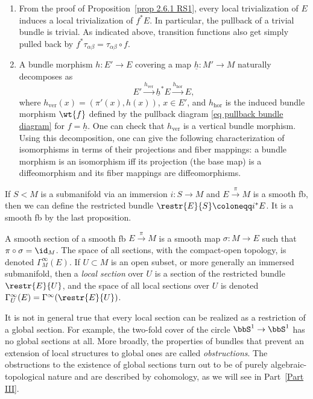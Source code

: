 \begin{rem}
\begin{enumerate}
    \item From the proof of Proposition~\ref{prop 2.6.1 RS1}, every local trivialization of $E$ induces a local trivialization of $f^\ast E$. In particular, the pullback of a trivial bundle is trivial. As indicated above, transition functions also get simply pulled back by $f^\ast \tau_{\alpha\beta}=\tau_{\alpha\beta}\circ f$.
    \item A bundle morphism $h:E'\to E$ covering a map $\underline{h}:M'\to M$ naturally decomposes as
    \[E'\overset{h_{\mathrm{ver}}}{\to} \underline{h}^\ast E\overset{h_{\mathrm{hor}}}{\to} E,\label{eq 2.6.2 RS1}\]
    where $h_{\mathrm{ver}}(x)=(\pi'(x),h(x))$, $x\in E'$, and $h_{\mathrm{hor}}$ is the induced bundle morphism $\wt{f}$ defined by the pullback diagram \eqref{eq pullback bundle diagram} for $f=\underline{h}$. One can check that $h_{\mathrm{ver}}$ is a vertical bundle morphism.  Using this decomposition, one can give the following characterization of isomorphisms in terms of their projections and fiber mappings: a bundle morphism is an isomorphism iff its projection (the base map) is a diffeomorphism and its fiber mappings are diffeomorphisms.
\end{enumerate}
\end{rem}


\begin{defn}
    If $S< M$ is a submanifold via an immersion $i:S\to M$ and $E\overset{\pi}{\to}M$ is a smooth \gls{fb}, then we can define the restricted bundle $\restr{E}{S}\coloneqq i^\ast E$. It is a smooth \gls{fb} by the last proposition.
\end{defn}

\begin{defn}
    A smooth section of a smooth \gls{fb} $E\overset{\pi}{\to}M$ is a smooth map $\sigma:M\to E$ such that $\pi\circ \sigma=\id_M$. The space of all sections, with the compact-open topology, is denoted $\Gamma^\infty_M(E)$. If $U\subset M$ is an open subset, or more generally an immersed submanifold, then a \emph{local section} over $U$ is a section of the restricted bundle $\restr{E}{U}$, and the space of all local sections over $U$ is denoted $\Gamma^\infty_U(E)=\Gamma^\infty(\restr{E}{U})$.
\end{defn}
\begin{rem}
    It is not in general true that every local section can be realized as a restriction of a global section. For example, the two-fold cover of the circle $\bbS^1\to \bbS^1$ has no global sections at all. More broadly, the properties of bundles that prevent an extension of local structures to global ones are called \emph{obstructions}. The obstructions to the existence of global sections turn out to be of purely algebraic-topological nature and are described by cohomology, as we will see in Part~\ref{Part III}.
\end{rem}


